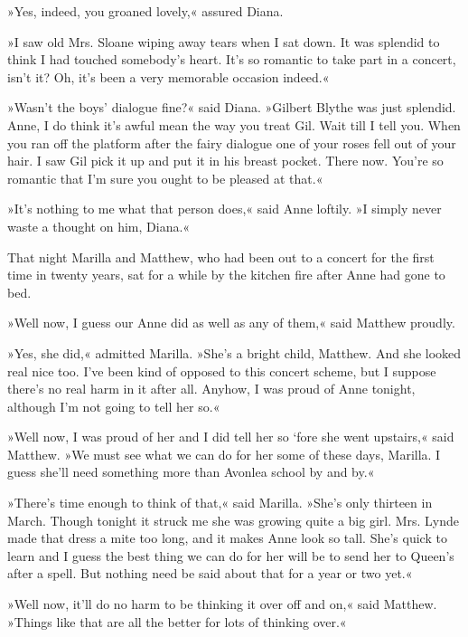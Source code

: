 »Yes, indeed, you groaned lovely,« assured Diana.

»I saw old Mrs. Sloane wiping away tears when I sat down. It was splendid to think I had touched somebody’s heart. It’s so romantic to take part in a concert, isn’t it? Oh, it’s been a very memorable occasion indeed.«

»Wasn’t the boys’ dialogue fine?« said Diana. »Gilbert Blythe was just splendid. Anne, I do think it’s awful mean the way you treat Gil. Wait till I tell you. When you ran off the platform after the fairy dialogue one of your roses fell out of your hair. I saw Gil pick it up and put it in his breast pocket. There now. You’re so romantic that I’m sure you ought to be pleased at that.«

»It’s nothing to me what that person does,« said Anne loftily. »I simply never waste a thought on him, Diana.«

That night Marilla and Matthew, who had been out to a concert for the first time in twenty years, sat for a while by the kitchen fire after Anne had gone to bed.

»Well now, I guess our Anne did as well as any of them,« said Matthew proudly.

»Yes, she did,« admitted Marilla. »She’s a bright child, Matthew. And she looked real nice too. I’ve been kind of opposed to this concert scheme, but I suppose there’s no real harm in it after all. Anyhow, I was proud of Anne tonight, although I’m not going to tell her so.«

»Well now, I was proud of her and I did tell her so ‘fore she went upstairs,« said Matthew. »We must see what we can do for her some of these days, Marilla. I guess she’ll need something more than Avonlea school by and by.«

»There’s time enough to think of that,« said Marilla. »She’s only thirteen in March. Though tonight it struck me she was growing quite a big girl. Mrs. Lynde made that dress a mite too long, and it makes Anne look so tall. She’s quick to learn and I guess the best thing we can do for her will be to send her to Queen’s after a spell. But nothing need be said about that for a year or two yet.«

»Well now, it’ll do no harm to be thinking it over off and on,« said Matthew. »Things like that are all the better for lots of thinking over.«